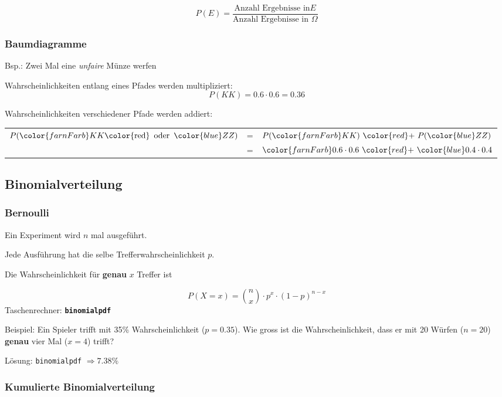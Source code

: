\begin{multicols}{2}
$$P(E) = \frac{\textrm{Anzahl Ergebnisse in
}E}{\textrm{Anzahl Ergebnisse in }\Omega}$$%
\subsubsection*{Baumdiagramme}
Bsp.: Zwei Mal eine \textit{unfaire} Münze werfen

Wahrscheinlichkeiten {\color{farnFarb}entlang} eines Pfades werden {\color{farnFarb}multipliziert}:
$$P(KK) = 0.6\cdot0.6=0.36$$

Wahrscheinlichkeiten {\color{red}verschiedener} Pfade werden
{\color{red}addiert}:

\begin{tabular}{rcl}
$P({\color{farnFarb}KK} \textrm{\color{red}\, oder\, } {\color{blue}ZZ})$ &=&
  $P({\color{farnFarb}KK})\ {\color{red}+}\ P({\color{blue}ZZ})$\\
  &=&${\color{farnFarb}0.6\cdot0.6} \ {\color{red}+}\ {\color{blue}0.4\cdot0.4}$
\end{tabular}

\forceCB{}

\subsection*{Binomialverteilung}
\subsubsection*{Bernoulli}
\headerUndFooterJedeSeite{}

Ein Experiment wird $n$ mal ausgeführt.

Jede Ausführung hat die selbe Trefferwahrscheinlichkeit $p$.

Die Wahrscheinlichkeit für \textbf{genau} $x$ Treffer ist


\begin{tcolorbox}[colback=white]
$$P(X=x) = {n \choose x}\cdot{}p^x\cdot{}(1-p)^{n-x}$$
Taschenrechner:  \textbf{\texttt{binomialpdf}}
\end{tcolorbox}%

Beispiel: Ein Spieler trifft mit 35\% Wahrscheinlichkeit
($p=0.35$). Wie gross ist die Wahrscheinlichkeit, dass er mit 20 Würfen
($n=20$) \textbf{genau} vier Mal ($x=4$) trifft?

Lösung: \texttt{binomialpdf} $\Longrightarrow 7.38\%$


\subsubsection*{Kumulierte Binomialverteilung}


\end{multicols}
